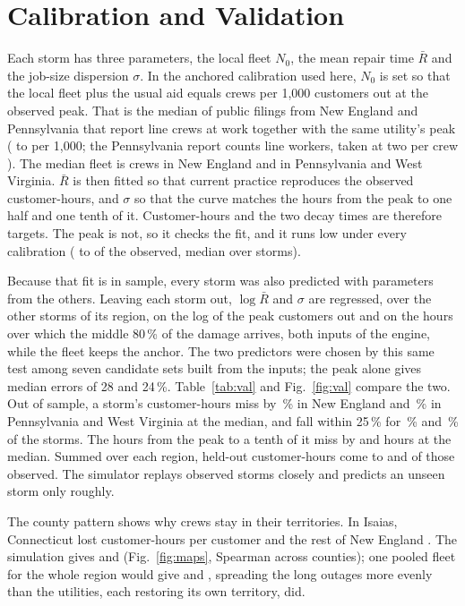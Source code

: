\documentclass[conference,letterpaper]{IEEEtran}
\begin{document}
\section{Calibration and Validation}\label{sec:val}

Each storm has three parameters, the local fleet $N_0$, the mean repair time $\bar R$ and the job-size dispersion
$\sigma$. In the anchored calibration used here, $N_0$ is set so that the local fleet plus the usual aid equals
\anchorRatio{} crews per 1,000 customers out at the observed peak. That is the median of \nAnchors{}
public filings from New England and Pennsylvania that report line crews at work together with the same
utility's peak (\anchorMin{} to \anchorMax{} per 1,000; the Pennsylvania report counts line workers, taken at two per
crew \cite{papuc2025storm}). The median fleet is \fleetNE{} crews in New England and \fleetPA{} in Pennsylvania
and West Virginia. $\bar R$ is then fitted so that current practice reproduces the observed customer-hours, and
$\sigma$ so that the curve matches the hours from the peak to one half and one tenth of it. Customer-hours and the two
decay times are therefore targets. The peak is not, so it checks the fit, and it runs low under every calibration
(\peakAllMin{} to \peakAllMax{} of the observed, median over storms).

Because that fit is in sample, every storm was also predicted with parameters from the others. Leaving each storm out,
$\log\bar R$ and $\sigma$ are regressed, over the other storms of its region, on the log of the peak customers out and on the hours
over which the middle 80\,\% of the damage arrives, both inputs of the engine, while the fleet keeps the anchor. The two predictors were chosen by this same test among seven candidate sets built from the
inputs; the peak alone gives median errors of 28 and 24\,\%. Table~\ref{tab:val} and Fig.~\ref{fig:val} compare the two. Out of
sample, a storm's customer-hours miss by \chErrOutNE\,\% in New England and \chErrOutPA\,\% in Pennsylvania and West
Virginia at the median, and fall within 25\,\% for \chWithinOutNE\,\% and \chWithinOutPA\,\% of the storms. The hours
from the peak to a tenth of it miss by \tNinetyOutNE{} and \tNinetyOutPA{} hours at the median. Summed over each
region, held-out customer-hours come to \chPooledOutNE{} and \chPooledOutPA{} of those observed. The simulator replays
observed storms closely and predicts an unseen storm only roughly.

The county pattern shows why crews stay in their territories. In Isaias, Connecticut lost \isaiasCHObsCT{} customer-hours per customer
and the rest of New England \isaiasCHObsRest. The simulation gives \isaiasCHSimCT{} and \isaiasCHSimRest{}
(Fig.~\ref{fig:maps}, Spearman \isaiasCountyRho{} across counties); one pooled fleet for the whole region would give \isaiasCHPoolCT{} and
\isaiasCHPoolRest, spreading the long outages more evenly than the utilities, each restoring its own territory, did.
\end{document}
